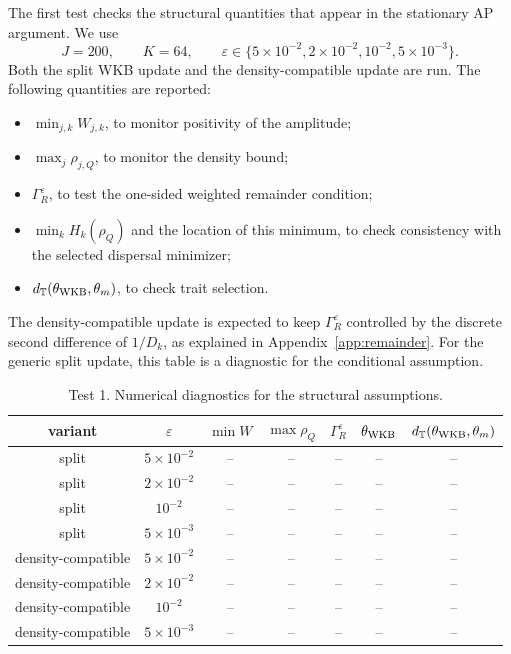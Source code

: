 \documentclass[11pt]{article}
\begin{document}
The first test checks the structural quantities that appear in the stationary AP argument.  We use
\[
    J=200,
    \qquad
    K=64,
    \qquad
    \varepsilon\in\{5\times10^{-2},2\times10^{-2},10^{-2},5\times10^{-3}\}.
\]
Both the split WKB update and the density-compatible update are run.  The following quantities are reported:
\begin{itemize}
\item \(\min_{j,k} W_{j,k}\), to monitor positivity of the amplitude;
\item \(\max_j\rho_{j,Q}\), to monitor the density bound;
\item \(\Gamma_R^\varepsilon\), to test the one-sided weighted remainder condition;
\item \(\min_k H_k(\rho_Q)\) and the location of this minimum, to check consistency with the selected dispersal minimizer;
\item \(d_{\mathbb T}(\theta_{\rm WKB},\theta_m)\), to check trait selection.
\end{itemize}
The density-compatible update is expected to keep \(\Gamma_R^\varepsilon\) controlled by the discrete second difference of \(1/D_k\), as explained in Appendix~\ref{app:remainder}.  For the generic split update, this table is a diagnostic for the conditional assumption.

\begin{table}[ht]
\centering
\caption{Test 1. Numerical diagnostics for the structural assumptions.}
\begin{tabular}{ccccccc}
\toprule
variant & $\varepsilon$ & $\min W$ & $\max\rho_Q$ & $\Gamma_R^\varepsilon$ & $\theta_{\rm WKB}$ & $d_{\mathbb T}(\theta_{\rm WKB},\theta_m)$\\
\midrule
split & $5\times10^{-2}$ & -- & -- & -- & -- & --\\
split & $2\times10^{-2}$ & -- & -- & -- & -- & --\\
split & $10^{-2}$ & -- & -- & -- & -- & --\\
split & $5\times10^{-3}$ & -- & -- & -- & -- & --\\
density-compatible & $5\times10^{-2}$ & -- & -- & -- & -- & --\\
density-compatible & $2\times10^{-2}$ & -- & -- & -- & -- & --\\
density-compatible & $10^{-2}$ & -- & -- & -- & -- & --\\
density-compatible & $5\times10^{-3}$ & -- & -- & -- & -- & --\\
\bottomrule
\end{tabular}
\end{table}
\end{document}

